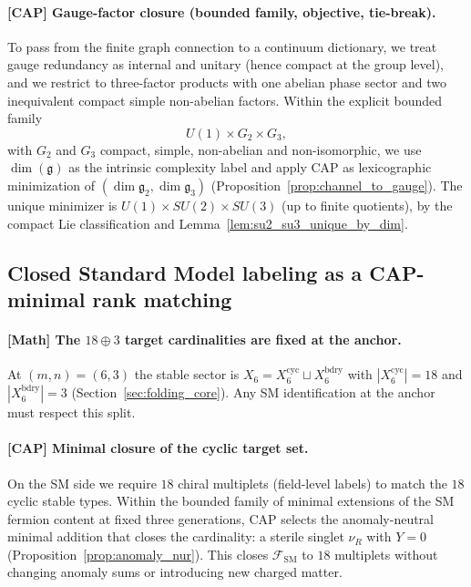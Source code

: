 \paragraph{[CAP] Gauge-factor closure (bounded family, objective, tie-break).}
To pass from the finite graph connection to a continuum dictionary, we treat gauge redundancy as internal and unitary (hence compact at the group level), and we restrict to three-factor products with one abelian phase sector and two inequivalent compact simple non-abelian factors.
Within the explicit bounded family
\[
U(1)\times G_2\times G_3,
\]
with $G_2$ and $G_3$ compact, simple, non-abelian and non-isomorphic, we use $\dim(\mathfrak{g})$ as the intrinsic complexity label and apply CAP as lexicographic minimization of $(\dim\mathfrak{g}_2,\dim\mathfrak{g}_3)$ (Proposition~\ref{prop:channel_to_gauge}).
The unique minimizer is $U(1)\times SU(2)\times SU(3)$ (up to finite quotients), by the compact Lie classification and Lemma~\ref{lem:su2_su3_unique_by_dim}.

\subsection{Closed Standard Model labeling as a CAP-minimal rank matching}
\label{subsec:tick_cap_labeling}

\paragraph{[Math] The \texorpdfstring{$18\oplus 3$}{18+3} target cardinalities are fixed at the anchor.}
At $(m,n)=(6,3)$ the stable sector is $X_6=X_6^{\mathrm{cyc}}\sqcup X_6^{\mathrm{bdry}}$ with $|X_6^{\mathrm{cyc}}|=18$ and $|X_6^{\mathrm{bdry}}|=3$ (Section~\ref{sec:folding_core}).
Any SM identification at the anchor must respect this split.

\paragraph{[CAP] Minimal closure of the cyclic target set.}
On the SM side we require $18$ chiral multiplets (field-level labels) to match the $18$ cyclic stable types.
Within the bounded family of minimal extensions of the SM fermion content at fixed three generations, CAP selects the anomaly-neutral minimal addition that closes the cardinality: a sterile singlet $\nu_R$ with $Y=0$ (Proposition~\ref{prop:anomaly_nur}).
This closes $\mathcal{F}_{\mathrm{SM}}$ to $18$ multiplets without changing anomaly sums or introducing new charged matter.

